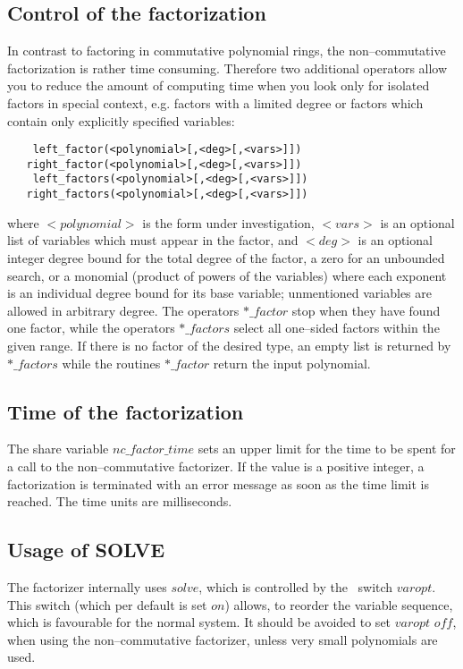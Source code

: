 \subsection{Control of the factorization}

In contrast to factoring in commutative polynomial rings, the non--commutative
factorization is rather time consuming. Therefore two additional
operators allow you to reduce the amount of computing time when
you look only for isolated factors in special context, e.g. factors
with a limited degree or factors which contain only explicitly
specified variables:
\begin{verbatim}
    left_factor(<polynomial>[,<deg>[,<vars>]])
   right_factor(<polynomial>[,<deg>[,<vars>]])
    left_factors(<polynomial>[,<deg>[,<vars>]])
   right_factors(<polynomial>[,<deg>[,<vars>]])
\end{verbatim}
where $<polynomial>$ is the form under investigation,
$<vars>$ is an optional list of variables which must appear in the
factor, and $<deg>$
is an optional integer degree bound for the total degree of the
factor, a zero for an unbounded search, or a monomial
(product of powers of the variables) where each exponent
is an individual degree bound for its base variable; unmentioned
variables are allowed in arbitrary degree. The operators
$*\_factor$ stop when they have found one factor, while
the operators $*\_factors$ select all one--sided factors
within the given range. If there is no factor of the
desired type, an empty list is returned by $*\_factors$
while the routines $*\_factor$ return the input polynomial.

\subsection{Time of the factorization}

The share variable $nc\_factor\_time$ sets an upper limit
for the time to be spent for a call to the non--commutative
factorizer. If the value is a positive integer, a
factorization is terminated with an error message as soon
as the time limit is reached. The time units are milliseconds.

\subsection{Usage of SOLVE}

The factorizer internally uses $solve$, which is controlled
by the \REDUCE \ switch $varopt$. This switch (which per default
is set $on$) allows, to reorder the variable sequence, which is
favourable for the normal system. It should be avoided to set $varopt$
$off$, when using the non--commutative factorizer, unless very small
polynomials are used.

